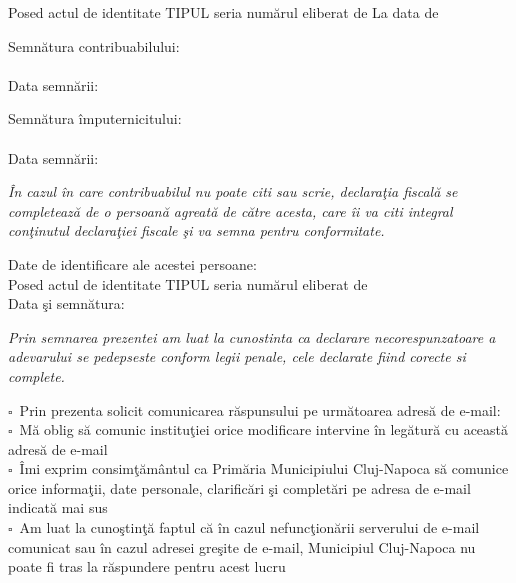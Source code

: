 \documentclass[10pt,a4paper]{article}
\newcommand{\fillline}[1][6cm]{\underline{\hspace{#1}}}
\newcommand{\checkboxempty}{$\square$}
\begin{document}
\vspace{0.3cm}

Posed actul de identitate TIPUL \fillline[2cm] seria \fillline[1.5cm] numărul \fillline[2.5cm] eliberat de \fillline[4cm] La data de \fillline[3cm]

\vspace{0.5cm}

\begin{minipage}[t]{0.45\textwidth}
Semnătura contribuabilului:\\
\hrulefill\\
Data semnării: \fillline[3cm]
\end{minipage}
\hfill
\begin{minipage}[t]{0.45\textwidth}
Semnătura împuternicitului:\\
\hrulefill\\
Data semnării: \fillline[3cm]
\end{minipage}

\vspace{0.4cm}

\textit{În cazul în care contribuabilul nu poate citi sau scrie, declaraţia fiscală se completează de o persoană agreată de către acesta, care îi va citi integral conţinutul declaraţiei fiscale şi va semna pentru conformitate.}

\vspace{0.2cm}

Date de identificare ale acestei persoane:\\
Posed actul de identitate TIPUL \fillline[2cm] seria \fillline[1.5cm] numărul \fillline[2.5cm] eliberat de \fillline[4cm]\\
Data şi semnătura: \fillline[6cm]

\vspace{0.4cm}

\textit{Prin semnarea prezentei am luat la cunostinta ca declarare necorespunzatoare a adevarului se pedepseste conform legii penale, cele declarate fiind corecte si complete.}

\vspace{0.3cm}

\checkboxempty\ Prin prezenta solicit comunicarea răspunsului pe următoarea adresă de e-mail: \hrulefill\\
\checkboxempty\ Mă oblig să comunic instituţiei orice modificare intervine în legătură cu această adresă de e-mail\\
\checkboxempty\ Îmi exprim consimţământul ca Primăria Municipiului Cluj-Napoca să comunice orice informaţii, date personale, clarificări şi completări pe adresa de e-mail indicată mai sus\\
\checkboxempty\ Am luat la cunoştinţă faptul că în cazul nefuncţionării serverului de e-mail comunicat sau în cazul adresei greşite de e-mail, Municipiul Cluj-Napoca nu poate fi tras la răspundere pentru acest lucru
\end{document}
